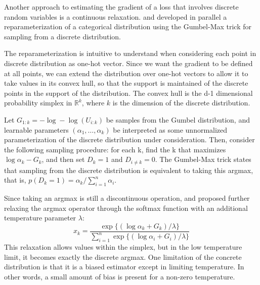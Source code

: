 \documentclass{article}
\begin{document}
Another approach to estimating the gradient of a loss that involves discrete random variables is a continuous relaxation. 
\cite{maddison2016concrete} and \cite{jang2016categorical} developed in parallel a reparameterization of a categorical distribution using the Gumbel-Max trick for sampling from a discrete distribution.

The reparameterization is intuitive to understand when considering each point in discrete distribution as one-hot vector.
Since we want the gradient to be defined at all points, we can extend the distribution over one-hot vectors to allow it to take values in its convex hull, so that the support is maintained of the discrete points in the support of the distribution.
The convex hull is the d-1 dimensional probability simplex in $\mathbb{R}^k$, where $k$ is the dimension of the discrete distribution.

Let $G_{1:k} = -\log-\log(U_{i:k})$ be samples from the Gumbel distribution, and learnable parameters $(\alpha_1, \dots, \alpha_k)$ be interpreted as some unnormalized parameterization of the discrete distribution under consideration.
Then, consider the following sampling procedure: for each k, find the k that maximizes $\log \alpha_k - G_k$, and then set $D_k=1$ and $D_{i \neq k} = 0$. The Gumbel-Max trick states that sampling from the discrete distribution is equivalent to taking this argmax, that is, $p(D_k = 1) = \alpha_k / \sum_{i=1}^n \alpha_i$.

Since taking an argmax is still a discontinuous operation, \cite{maddison2016concrete} and \cite{jang2016categorical} proposed further relaxing the argmax operator through the softmax function with an additional temperature parameter $\lambda$:
\begin{equation}
x_k = \frac{\exp\{( \log \alpha_k+ G_k) / \lambda\}}{\sum_{i=1}^n\exp\{( \log \alpha_i+ G_i) / \lambda\}}
\end{equation}
This relaxation allows values within the simplex, but in the low temperature limit, it becomes exactly the discrete argmax.
One limitation of the concrete distribution is that it is a biased estimator except in limiting temperature.
In other words, a small amount of bias is present for a non-zero temperature.


\end{document}
